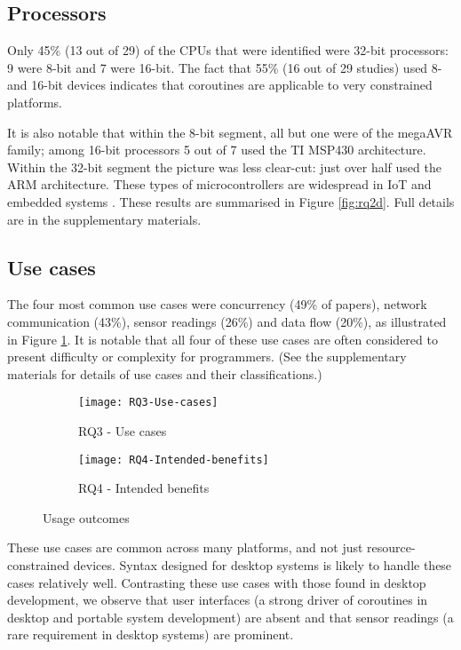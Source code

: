 \subsection{Processors}

Only 45\% (13 out of 29) of the CPUs that were identified were 32-bit processors: 9 were 8-bit and 7 were 16-bit. The fact that 55\% (16 out of 29 studies) used 8- and 16-bit devices indicates that coroutines are applicable to very constrained platforms.

It is also notable that within the 8-bit segment, all but one were of the megaAVR family; among 16-bit processors 5 out of 7 used the TI MSP430 architecture. Within the 32-bit segment the picture was less clear-cut: just over half used the ARM architecture. These types of microcontrollers are widespread in IoT and embedded systems \cite{AspenCore2017}. These results are summarised in Figure \ref{fig:rq2d}. Full details are in the supplementary materials.

\subsection{Use cases}

The four most common use cases were concurrency (49\% of papers), network communication (43\%), sensor readings (26\%) and data flow (20\%), as illustrated in Figure \ref{fig:rq3}. It is notable that all four of these use cases are often considered to present difficulty or complexity for programmers. (See the supplementary materials for details of use cases and their classifications.)

\begin{figure}[h]
	\centering
	\begin{subfigure}[h]{0.46\textwidth}
		\centering
		\texttt{[image: RQ3-Use-cases]}
		\caption{RQ3 - Use cases}
		\label{fig:rq3}
	\end{subfigure}
	\begin{subfigure}[h]{0.46\textwidth}
		\centering
		\texttt{[image: RQ4-Intended-benefits]}
		\caption{RQ4 - Intended benefits}
		\label{fig:rq4}
	\end{subfigure}
	\caption{Usage outcomes}
\end{figure}

These use cases are common across many platforms, and not just resource-constrained devices. Syntax designed for desktop systems is likely to handle these cases relatively well. Contrasting these use cases with those found in desktop development, we observe that user interfaces (a strong driver of coroutines in desktop and portable system development) are absent and that sensor readings (a rare requirement in desktop systems) are prominent.


